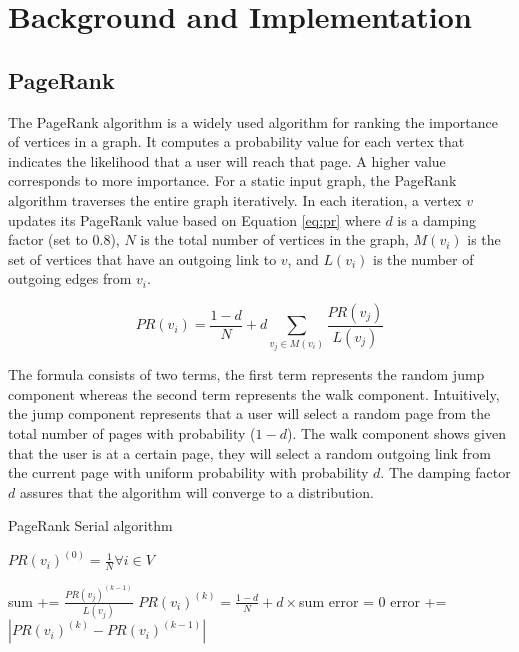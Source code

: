 \documentclass[11pt]{article}
\begin{document}
\section{Background and Implementation}
\label{sec:org18d7281}
\subsection{PageRank}
\label{sec:orge838942}
The PageRank algorithm is a widely used algorithm for ranking the importance of vertices in a graph. It computes a probability value for each vertex that indicates the likelihood that a user will reach that page. A higher value corresponds to more importance. For a static input graph, the PageRank algorithm traverses the entire graph iteratively. In each iteration, a vertex \(v\) updates its PageRank value based on Equation \ref{eq:pr} where \(d\) is a damping factor (set to 0.8), \(N\) is the total number of vertices in the graph, \(M(v_i)\) is the set of vertices that have an outgoing link to \(v\), and \(L(v_i)\) is the number of outgoing edges from \(v_i\).

\begin{equation}
  \label{eq:pr}
  PR(v_i) = \frac{1-d}{N} + d \sum_{v_j \in M(v_i)} \frac{PR (v_j)}{L(v_j)}
\end{equation}

The formula consists of two terms, the first term represents the random jump component whereas the second term represents the walk component. Intuitively, the jump component represents that a user will select a random page from the total number of pages with probability (\(1-d\)). The walk component shows given that the user is at a certain page, they will select a random outgoing link from the current page with uniform probability with probability \(d\). The damping factor \(d\) assures that the algorithm will converge to a distribution.

\begin{algorithm}
\caption{PageRank Serial algorithm}\label{alg:pr}
\begin{algorithmic}
\Require $PR(v_{i})^{(0)} = \frac{1}{N} \forall i \in V$

\State sum += $ \frac{PR (v_j)^{(k-1)}}{L(v_j)}$
\EndFor
\State $PR(v_{i})^{(k)} = \frac{1-d}{N} + d \times$sum
\EndFor
\State error = 0
\State error += $|PR(v_{i})^{(k)} - PR(v_{i})^{(k-1)}|$
\EndFor
\EndWhile
\end{algorithmic}
\end{algorithm}
\end{document}
